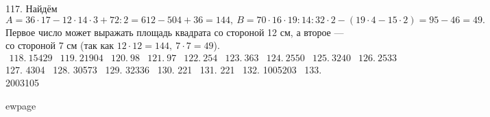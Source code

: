 117. Найдём $A=36\cdot17-12\cdot14\cdot3+72:2=612-504+36=144,\ B=70\cdot16\cdot19:14:32\cdot2-(19\cdot4-15\cdot2)=95-46=49.$ Первое число может выражать площадь квадрата со стороной 12 см, а второе --- со стороной 7 см (так как $12\cdot12=144,\ 7\cdot7=49$).\\
$\begin{array}{lllllllllllll}
118.\ 15429& 119.\ 21904& 120.\ 98& 121.\ 97& 122.\ 254& 123.\ 363 & 124.\ 2550 & 125.\ 3240 & 126.\ 2533 \end{array}$\\
127. 4304 \ 128. 30573 \ 129. 32336 \ 130. 221 \ 131. 221 \ 132. 1005203 \ 133. 2003105

ewpage
